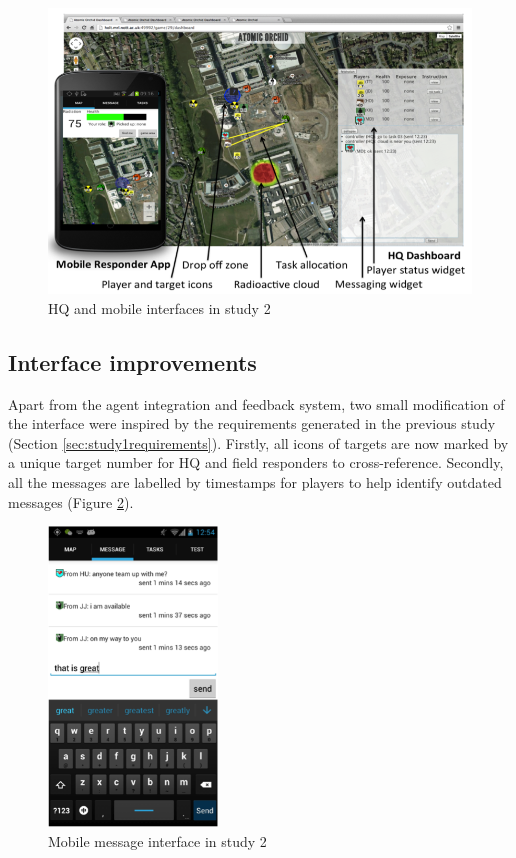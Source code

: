 \begin{figure}[h]
  \centering
  \includegraphics[width=1\textwidth]{img/study2/system/HQ}
  \caption{HQ and mobile interfaces in study 2}
  \label{fig:study2HQ}
\end{figure}


\subsection{Interface improvements}\label{sec:studytwointerface}
Apart from the agent integration and feedback system, two small modification of the interface were inspired by the requirements generated in the previous study (Section \ref{sec:study1requirements}). Firstly, all icons of targets are now marked by a unique target number for HQ and field responders to cross-reference. Secondly, all the messages are labelled by timestamps for players to help identify outdated messages (Figure \ref{fig:study2mobilemsg}).\\

\begin{figure}[h]
  \centering
  \includegraphics[width=0.4\textwidth]{img/study2/system/mobilemsg}
  \caption{Mobile message interface in study 2}
  \label{fig:study2mobilemsg}
\end{figure}

